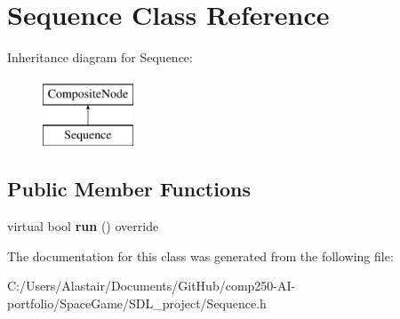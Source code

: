 \hypertarget{class_sequence}{}\section{Sequence Class Reference}
\label{class_sequence}
Inheritance diagram for Sequence\+:\begin{figure}[H]
\begin{center}
\leavevmode
\includegraphics[height=2.000000cm]{class_sequence}
\end{center}
\end{figure}
\subsection*{Public Member Functions}
\begin{DoxyCompactItemize}
\item 
\mbox{\label{class_sequence_ad9eb21db650776a278d3f2c1e7499dd8}} 
virtual bool {\bfseries run} () override
\end{DoxyCompactItemize}


The documentation for this class was generated from the following file\+:\begin{DoxyCompactItemize}
\item 
C\+:/\+Users/\+Alastair/\+Documents/\+Git\+Hub/comp250-\/\+A\+I-\/portfolio/\+Space\+Game/\+S\+D\+L\+\_\+project/Sequence.\+h\end{DoxyCompactItemize}
